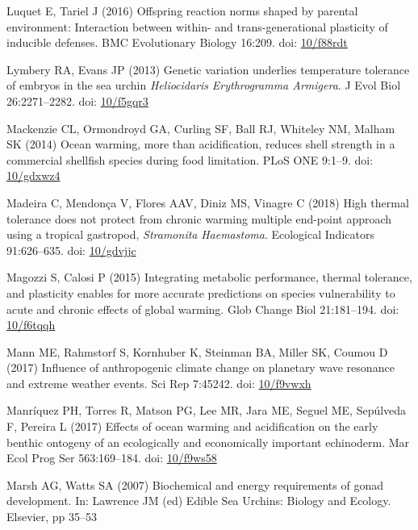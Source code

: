 \documentclass[a4paper,10pt, oneside]{memoir}
\begin{document}
\leavevmode\hypertarget{ref-Luquet2016}{}%
Luquet E, Tariel J (2016) Offspring reaction norms shaped by parental environment: Interaction between within- and trans-generational plasticity of inducible defenses. BMC Evolutionary Biology 16:209. doi: \href{https://doi.org/10/f88rdt}{10/f88rdt}

\leavevmode\hypertarget{ref-Lymbery2013}{}%
Lymbery RA, Evans JP (2013) Genetic variation underlies temperature tolerance of embryos in the sea urchin \emph{Heliocidaris} \emph{Erythrogramma Armigera}. J Evol Biol 26:2271--2282. doi: \href{https://doi.org/10/f5gqr3}{10/f5gqr3}

\leavevmode\hypertarget{ref-Mackenzie2014}{}%
Mackenzie CL, Ormondroyd GA, Curling SF, Ball RJ, Whiteley NM, Malham SK (2014) Ocean warming, more than acidification, reduces shell strength in a commercial shellfish species during food limitation. PLoS ONE 9:1--9. doi: \href{https://doi.org/10/gdxwz4}{10/gdxwz4}

\leavevmode\hypertarget{ref-Madeira2018}{}%
Madeira C, Mendonça V, Flores AAV, Diniz MS, Vinagre C (2018) High thermal tolerance does not protect from chronic warming multiple end-point approach using a tropical gastropod, \emph{Stramonita} \emph{Haemastoma}. Ecological Indicators 91:626--635. doi: \href{https://doi.org/10/gdvjjc}{10/gdvjjc}

\leavevmode\hypertarget{ref-Magozzi2015}{}%
Magozzi S, Calosi P (2015) Integrating metabolic performance, thermal tolerance, and plasticity enables for more accurate predictions on species vulnerability to acute and chronic effects of global warming. Glob Change Biol 21:181--194. doi: \href{https://doi.org/10/f6tqqh}{10/f6tqqh}

\leavevmode\hypertarget{ref-Mann2017}{}%
Mann ME, Rahmstorf S, Kornhuber K, Steinman BA, Miller SK, Coumou D (2017) Influence of anthropogenic climate change on planetary wave resonance and extreme weather events. Sci Rep 7:45242. doi: \href{https://doi.org/10/f9vwxh}{10/f9vwxh}

\leavevmode\hypertarget{ref-Manriquez2017}{}%
Manríquez PH, Torres R, Matson PG, Lee MR, Jara ME, Seguel ME, Sepúlveda F, Pereira L (2017) Effects of ocean warming and acidification on the early benthic ontogeny of an ecologically and economically important echinoderm. Mar Ecol Prog Ser 563:169--184. doi: \href{https://doi.org/10/f9ws58}{10/f9ws58}

\leavevmode\hypertarget{ref-Marsh2007}{}%
Marsh AG, Watts SA (2007) Biochemical and energy requirements of gonad development. In: Lawrence JM (ed) Edible Sea Urchins: Biology and Ecology. Elsevier, pp 35--53
\end{document}
